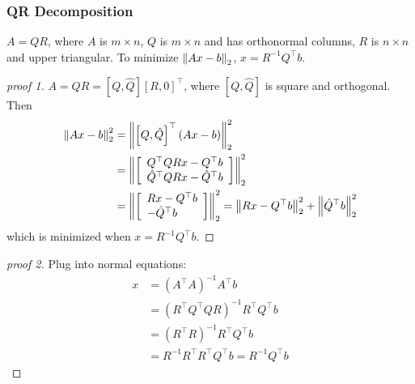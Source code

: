\documentclass[11pt]{article}
\numberwithin{equation}{section}
\begin{document}
\subsubsection{QR Decomposition}
$A=QR$, where $A$ is $m \times n$, $Q$ is $m \times n$ and has orthonormal columns, $R$ is $n \times n$ and upper triangular. To minimize $\left\| Ax-b \right\|_2$,
$x=R^{-1}Q^\top b$.
\begin{proof}[proof 1]
    $A=QR=\left[ Q, \hat{Q} \right]\left[ R, 0 \right]^\top$, where $\left[ Q, \hat{Q} \right]$ is square and orthogonal. Then \begin{align*}
        \left\| Ax-b \right\|_2^2 &= \left\| \left[ Q, \hat{Q} \right]^\top (Ax-b) \right\|_2^2 \\
        &= \left\| \left[\begin{array}{l}
            Q^{\top} Q R{x}-Q^\top b \\
            \hat{Q}^{\top} Q R {x}-\hat{Q}^{\top} b
            \end{array}\right] \right\|_2^2 \\
        &= \left\| \left[\begin{array}{l}
            R{x}-Q^\top b \\
            -\hat{Q}^{\top} b
            \end{array}\right] \right\|_2^2 = \left\| R{x}-Q^\top b \right\|_2^2 + \left\| \hat{Q}^{\top} b \right\|_2^2
    \end{align*}
    which is minimized when $x = R^{-1} Q^{\top} b$.
\end{proof}

\begin{proof}[proof 2]
    Plug into normal equations: \begin{align*}
        x &= \left(A^{\top} A\right)^{-1} A^{\top} b \\
        &= \left(R^{\top} Q^{\top} Q R\right)^{-1} R^{\top} Q^{\top} b \\
        &= \left(R^{\top} R\right)^{-1} R^{\top} Q^{\top} b \\
        &= R^{-1} R^{\top} R^{\top} Q^{\top} b = R^{-1} Q^\top b
    \end{align*}
\end{proof}
\end{document}

